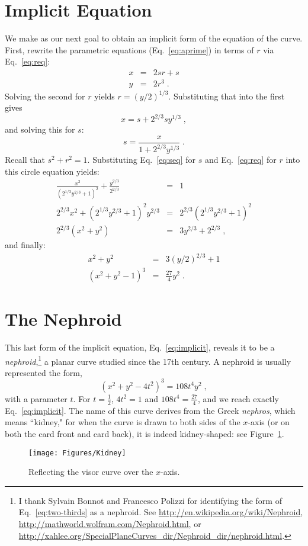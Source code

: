 \pdfoutput=1  \documentclass[]{article}
\newcommand{\eqnlab}[1]{\label{eq:#1}}
\newcommand{\figlab}[1]{\label{fig:#1}}
\newcommand{\eqnref}[1]{\ref{eq:#1}}
\newcommand{\figref}[1]{\ref{fig:#1}}
\begin{document}
\section{Implicit Equation}
We make as our next goal to obtain an implicit form of the equation of the curve.
First, rewrite the parametric equations (Eq.~\eqnref{aprime}) in terms of $r$ via Eq.~\eqnref{req}: 
\begin{eqnarray*}
x &=& 2 s r + s \\
y &=& 2r^3 \; .
\end{eqnarray*}
Solving the second for $r$ yields $r = (y/2)^{1/3}$.
Substituting that into the first gives
$$
x = s + 2^{2/3} s y^{1/3} \; ,
$$
and solving this for $s$:
$$
s = \frac{x}{1+ 2^{2/3} y^{1/3}} \;.
\eqnlab{seq}
$$
Recall that $s^2 + r^2 = 1$. Substituting Eq.~\eqnref{seq} for $s$ and Eq.~\eqnref{req} for $r$ 
into this circle equation yields:
\begin{eqnarray*}
\frac{x^2}{\left({2}^{1/3}
   y^{2/3}+1\right)^2}+\frac{y
   ^{2/3}}{2^{2/3}} &=& 1 \\
2^{2/3} x^2+\left({2}^{1/3}  y^{2/3}+1\right)^2
   y^{2/3} & = & 2^{2/3}
   \left({2}^{1/3}
y^{2/3}+1\right)^2 \\
   2^{2/3} \left(x^2+y^2\right) & = & 3
   y^{2/3}+2^{2/3} \; ,
\end{eqnarray*}
and finally:
\begin{eqnarray}
x^2+y^2 & = & 3 (y/2)^{2/3} + 1  \eqnlab{two-thirds}\\
(x^2+y^2-1)^3 & = & \frac{27}{4} y^2 \;.
\eqnlab{implicit}
\end{eqnarray}

\section{The Nephroid}
This last form of the implicit equation, Eq.~\eqnref{implicit},
reveals it to be a
\emph{nephroid},\footnote{
I thank Sylvain Bonnot and Francesco Polizzi for identifying 
the form of Eq.~\eqnref{two-thirds} as a nephroid.
See \url{http://en.wikipedia.org/wiki/Nephroid},
\url{http://mathworld.wolfram.com/Nephroid.html}, or
\url{http://xahlee.org/SpecialPlaneCurves_dir/Nephroid_dir/nephroid.html}.
}
a planar curve studied since the 17th century.
A nephroid
is usually represented the form, 
$$
 (x^2+y^2-4t^2)^3=108t^4y^2 \;,
$$
with a parameter $t$.
For $t=\frac{1}{2}$, $4 t^2 = 1$ and $108 t^4 = \frac{27}{4}$,
and we reach exactly
Eq.~\eqnref{implicit}.
The name of this curve derives from the Greek
\emph{nephros}, which means ``kidney,"
for when the curve is drawn to both sides of the $x$-axis
(or on both the card front and card back), it is indeed
kidney-shaped:
see Figure~\figref{Kidney}.
\begin{figure}[htbp]
\centering
\texttt{[image: Figures/Kidney]}
\caption{Reflecting the visor curve over the $x$-axis.}
\figlab{Kidney}
\end{figure}
\end{document}

